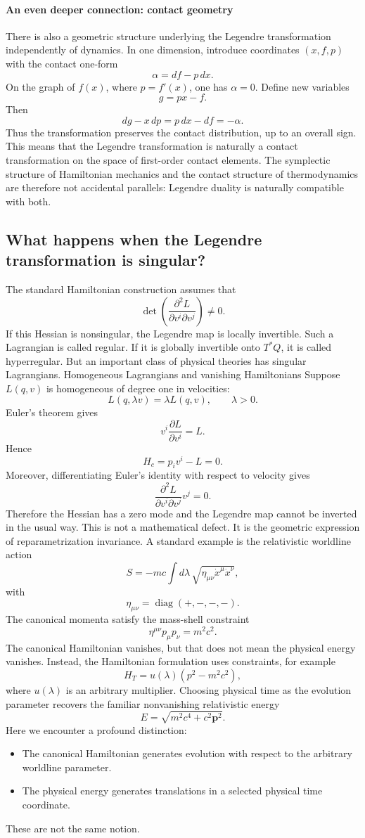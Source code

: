 \paragraph{An even deeper connection: contact geometry}
There is also a geometric structure underlying the Legendre transformation
independently of dynamics.
In one dimension, introduce coordinates \((x,f,p)\) with the contact one-form
\[
\alpha=df-p\,dx.
\]
On the graph of \(f(x)\), where \(p=f'(x)\), one has \(\alpha=0\).
Define new variables
\[
g=px-f.
\]
Then
\[
dg-x\,dp=p\,dx-df=-\alpha.
\]
Thus the transformation preserves the contact distribution, up to an overall
sign.
This means that the Legendre transformation is naturally a contact
transformation on the space of first-order contact elements.
The symplectic structure of Hamiltonian mechanics and the contact structure of
thermodynamics are therefore not accidental parallels: Legendre duality is
naturally compatible with both.

\subsection{What happens when the Legendre transformation is singular?}
The standard Hamiltonian construction assumes that
\[
\det\left(
\frac{\partial^2L}{\partial v^i\partial v^j}
\right)\ne0.
\]
If this Hessian is nonsingular, the Legendre map is locally invertible. Such a
Lagrangian is called regular.
If it is globally invertible onto \(T^*Q\), it is called hyperregular.
But an important class of physical theories has singular Lagrangians.
Homogeneous Lagrangians and vanishing Hamiltonians
Suppose \(L(q,v)\) is homogeneous of degree one in velocities:
\[
L(q,\lambda v)=\lambda L(q,v),\qquad \lambda>0.
\]
Euler's theorem gives
\[
v^i\frac{\partial L}{\partial v^i}=L.
\]
Hence
\[
\boxed{
H_c=p_iv^i-L=0.
}
\]
Moreover, differentiating Euler's identity with respect to velocity gives
\[
\frac{\partial^2L}{\partial v^i\partial v^j}v^j=0.
\]
Therefore the Hessian has a zero mode and the Legendre map cannot be inverted
in the usual way.
This is not a mathematical defect. It is the geometric expression of
reparametrization invariance.
A standard example is the relativistic worldline action
\[
S=-mc\int d\lambda\,
\sqrt{\eta_{\mu\nu}\dot x^\mu\dot x^\nu},
\]
with
\[
\eta_{\mu\nu}=\operatorname{diag}(+,-,-,-).
\]
The canonical momenta satisfy the mass-shell constraint
\[
\boxed{\eta^{\mu\nu}p_\mu p_\nu=m^2c^2.}
\]
The canonical Hamiltonian vanishes, but that does not mean the physical energy
vanishes.
Instead, the Hamiltonian formulation uses constraints, for example
\[
H_T=u(\lambda)(p^2-m^2c^2),
\]
where \(u(\lambda)\) is an arbitrary multiplier.
Choosing physical time as the evolution parameter recovers the familiar
nonvanishing relativistic energy
\[
E=\sqrt{m^2c^4+c^2\mathbf p^2}.
\]
Here we encounter a profound distinction:
\begin{itemize}
   \item The canonical Hamiltonian generates evolution with respect to the
       arbitrary worldline parameter.
   \item The physical energy generates translations in a selected physical time
       coordinate.
\end{itemize}
These are not the same notion.


